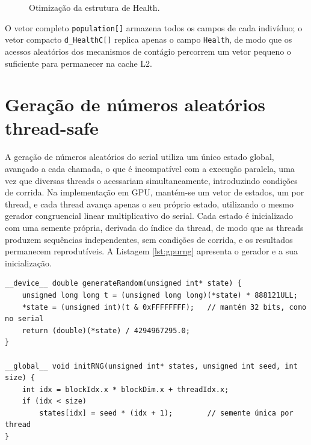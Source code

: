 \begin{figure}[H]
\centering
\caption{Otimização da estrutura de Health.}
\label{fig:healthsoa}
\end{figure}

O vetor completo \texttt{population[]} armazena todos os campos de cada indivíduo; o vetor compacto \texttt{d\_HealthC[]} replica apenas o campo \texttt{Health}, de modo que os acessos aleatórios dos mecanismos de contágio percorrem um vetor pequeno o suficiente para permanecer na cache L2.

\section{Geração de números aleatórios thread-safe}

A geração de números aleatórios do serial utiliza um único estado global, avançado a cada chamada, o que é incompatível com a execução paralela, uma vez que diversas threads o acessariam simultaneamente, introduzindo condições de corrida. Na implementação em GPU, mantém-se um vetor de estados, um por thread, e cada thread avança apenas o seu próprio estado, utilizando o mesmo gerador congruencial linear multiplicativo do serial. Cada estado é inicializado com uma semente própria, derivada do índice da thread, de modo que as threads produzem sequências independentes, sem condições de corrida, e os resultados permanecem reprodutíveis. A Listagem \ref{lst:gpurng} apresenta o gerador e a sua inicialização.

\begin{lstlisting}[caption={Gerador de números aleatórios por thread.}, label={lst:gpurng}]
__device__ double generateRandom(unsigned int* state) {
    unsigned long long t = (unsigned long long)(*state) * 888121ULL;
    *state = (unsigned int)(t & 0xFFFFFFFF);   // mantém 32 bits, como no serial
    return (double)(*state) / 4294967295.0;
}

__global__ void initRNG(unsigned int* states, unsigned int seed, int size) {
    int idx = blockIdx.x * blockDim.x + threadIdx.x;
    if (idx < size)
        states[idx] = seed * (idx + 1);        // semente única por thread
}
\end{lstlisting}


